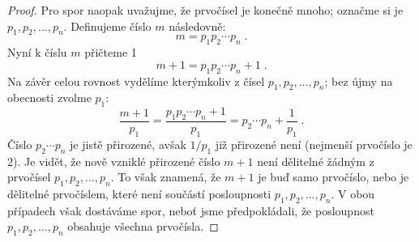 \begin{proof}
    Pro spor naopak uvažujme, že prvočísel je konečně mnoho; označme si je $p_1, p_2, \ldots, p_n$. Definujeme číslo $m$ následovně:
    \begin{equation*}
        m=p_1p_2\cdots p_n\; .
    \end{equation*}
    Nyní k číslu $m$ přičteme 1
    \begin{equation*}
        m+1=p_1p_2\cdots p_n+1\; .
    \end{equation*}
    Na závěr celou rovnost vydělíme kterýmkoliv z čísel $p_1, p_2, \ldots, p_n$; bez újmy na obecnosti zvolme $p_1$:
    \begin{equation*}
        \dfrac{m+1}{p_1}=\dfrac{p_1p_2\cdots p_n+1}{p_1}=p_2\cdots p_n+\dfrac{1}{p_1}\; .
    \end{equation*}
    Číslo $p_2\cdots p_n$ je jistě přirozené, avšak $1/p_1$ již přirozené není (nejmenší prvočíslo je 2). Je vidět, že nově vzniklé přirozené číslo $m+1$ není dělitelné žádným z prvočísel $p_1, p_2, \ldots, p_n$. To však znamená, že $m+1$ je buď samo prvočíslo, nebo je dělitelné prvočíslem, které není součástí posloupnosti $p_1, p_2, \ldots, p_n$. V obou případech však dostáváme spor, neboť jsme předpokládali, že posloupnost $p_1, p_2, \ldots, p_n$ obsahuje všechna prvočísla.
\end{proof}

